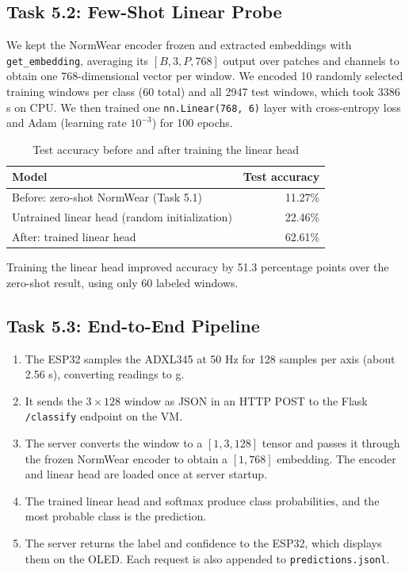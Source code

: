 \subsection{Task 5.2: Few-Shot Linear Probe}

We kept the NormWear encoder frozen and extracted embeddings with \texttt{get\_embedding}, averaging its $[B, 3, P, 768]$ output over patches and channels to obtain one 768-dimensional vector per window. We encoded 10 randomly selected training windows per class (60 total) and all 2947 test windows, which took 3386 s on CPU. We then trained one \texttt{nn.Linear(768, 6)} layer with cross-entropy loss and Adam (learning rate $10^{-3}$) for 100 epochs.

\begin{table}[h]
\centering
\begin{tabular}{lr}
\toprule
Model & Test accuracy \\
\midrule
Before: zero-shot NormWear (Task 5.1) & 11.27\% \\
Untrained linear head (random initialization) & 22.46\% \\
After: trained linear head & 62.61\% \\
\bottomrule
\end{tabular}
\caption{Test accuracy before and after training the linear head}
\end{table}

Training the linear head improved accuracy by 51.3 percentage points over the zero-shot result, using only 60 labeled windows.

\subsection{Task 5.3: End-to-End Pipeline}

\begin{enumerate}
    \item The ESP32 samples the ADXL345 at 50 Hz for 128 samples per axis (about 2.56 s), converting readings to g.
    \item It sends the $3 \times 128$ window as JSON in an HTTP POST to the Flask \texttt{/classify} endpoint on the VM.
    \item The server converts the window to a $[1, 3, 128]$ tensor and passes it through the frozen NormWear encoder to obtain a $[1, 768]$ embedding. The encoder and linear head are loaded once at server startup.
    \item The trained linear head and softmax produce class probabilities, and the most probable class is the prediction.
    \item The server returns the label and confidence to the ESP32, which displays them on the OLED. Each request is also appended to \texttt{predictions.jsonl}.
\end{enumerate}


